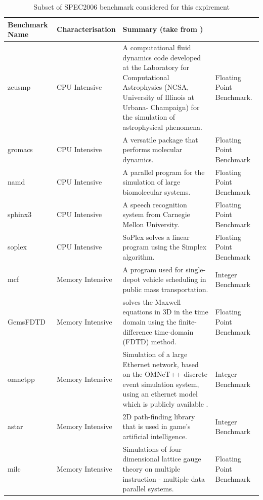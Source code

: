 \documentclass[a4paper,10pt,twoside]{article}
\begin{document}
\begin{table}[ht]
\caption{Subset of SPEC2006 benchmark considered for this expirement}
\begin{center}
    \begin{tabular}{ | l | l | p{5cm} | p{5cm} |}
    \hline
    Benchmark Name & Characterisation &  Summary (take from \cite{henning2006spec}) \\ \hline
    zeusmp & CPU Intensive & A computational fluid dynamics 
    code developed at the Laboratory for Computational Astrophysics
     (NCSA, University of Illinois at Urbana- Champaign) for the simulation of astrophysical phenomena. & Floating Point Benchmark. \\ \hline
    gromacs & CPU Intensive  & A versatile package that performs molecular dynamics. & Floating Point Benchmark\\ \hline
    namd & CPU Intensive  & A parallel program for the simulation of large biomolecular systems. & Floating Point Benchmark\\ \hline
    sphinx3 & CPU Intensive  & A speech recognition system from Carnegie Mellon University. & Floating Point Benchmark  \\ \hline
    soplex & CPU Intensive  &  SoPlex solves a linear program using the Simplex algorithm. & Floating Point Benchmark\\ \hline
    mcf & Memory Intensive  & A program used for single-depot vehicle scheduling in public mass transportation. & Integer Benchmark \\ \hline
    GemsFDTD & Memory Intensive  &  solves the Maxwell equations in 3D in the time domain using the finite-difference time-domain (FDTD) method. & Floating Point Benchmark\\ \hline
    omnetpp & Memory Intensive  &  Simulation of a large Ethernet network, based on the OMNeT++ discrete event simulation system, using an ethernet model which is publicly available . & Integer Benchmark\\ \hline
    astar & Memory Intensive  & 2D path-finding library that is used in game's artificial intelligence. & Integer Benchmark\\ \hline
    milc & Memory Intensive  &  Simulations of four dimensional lattice gauge theory on multiple instruction - multiple data parallel systems. & Floating Point Benchmark\\ \hline
    \end{tabular}
\end{center}
\label{tab:gt}
\end{table}
\end{document}
